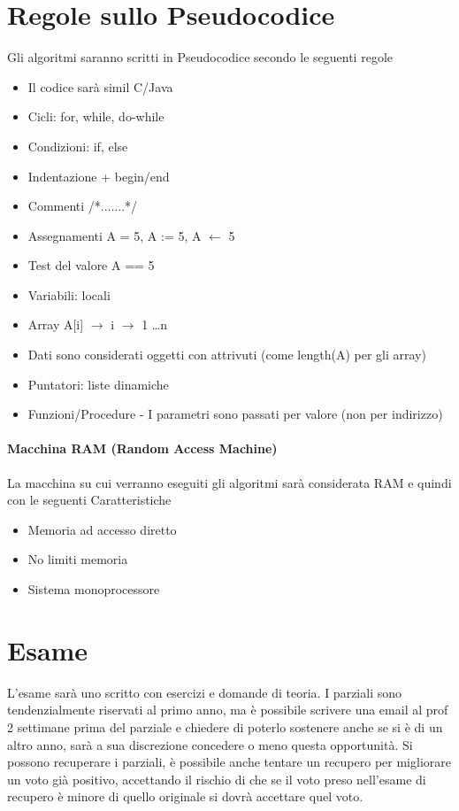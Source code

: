 \section{Regole sullo Pseudocodice}
Gli algoritmi saranno scritti in Pseudocodice secondo le seguenti regole
\begin{itemize}
    \item Il codice sarà simil C/Java
    \item Cicli: for, while, do-while
    \item Condizioni: if, else
    \item Indentazione + begin/end
    \item Commenti /*.......*/
    \item Assegnamenti A = 5, A := 5, A $\leftarrow$ 5
    \item Test del valore A == 5
    \item Variabili: locali
    \item Array A[i] $\rightarrow$ i $\rightarrow$ 1 \dots n
    \item Dati sono considerati oggetti con attrivuti (come length(A) per gli array)
    \item Puntatori: liste dinamiche
    \item Funzioni/Procedure - I parametri sono passati per valore (non per indirizzo)
\end{itemize}

\paragraph{Macchina RAM (Random Access Machine)}
La macchina su cui verranno eseguiti gli algoritmi sarà considerata RAM e quindi con le seguenti Caratteristiche
\begin{itemize}
    \item Memoria ad accesso diretto
    \item No limiti memoria
    \item Sistema monoprocessore
\end{itemize}

\section{Esame}
L'esame sarà uno scritto con esercizi e domande di teoria. 
I parziali sono tendenzialmente riservati al primo anno, ma è possibile scrivere una email al prof 2 settimane prima del parziale e chiedere di poterlo sostenere
anche se si è di un altro anno, sarà a sua discrezione concedere o meno questa opportunità.
Si possono recuperare i parziali, è possibile anche tentare un recupero per migliorare un voto già positivo, accettando il rischio di
che se il voto preso nell'esame di recupero è minore di quello originale si dovrà accettare quel voto.
